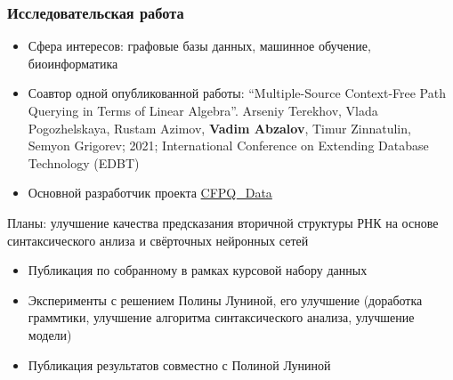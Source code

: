 \documentclass[xcolor=table,aspectratio=169]{beamer}
\begin{document}
\begin{frame}[fragile] \frametitle{Исследовательская работа}
  
    \begin{itemize}
        \item Сфера интересов: графовые базы данных, машинное обучение, биоинформатика
        \item Соавтор одной опубликованной работы: ``Multiple-Source Context-Free Path Querying in Terms of Linear Algebra''. Arseniy Terekhov, Vlada Pogozhelskaya, Rustam Azimov, \textbf{Vadim Abzalov}, Timur Zinnatulin, Semyon Grigorev; 2021; International Conference on Extending Database Technology (EDBT)        
        \item Основной разработчик проекта \href{https://github.com/JetBrains-Research/CFPQ_Data}{CFPQ\_Data}
    \end{itemize}
  \pause
  \vfill
  Планы: улучшение качества предсказания вторичной структуры РНК на основе синтаксического анлиза и свёрточных нейронных сетей
  \begin{itemize}
        \item Публикация по собранному в рамках курсовой набору данных
        \item Эксперименты с решением Полины Луниной, его улучшение (доработка граммтики, улучшение алгоритма синтаксического анализа, улучшение модели)
        \item Публикация результатов совместно с Полиной Луниной
  \end{itemize}

\end{frame}
\end{document}
